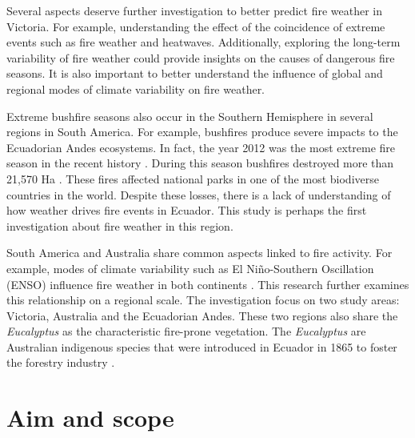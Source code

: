 Several aspects deserve further investigation to better predict fire
weather in Victoria. For example, understanding the effect of the coincidence of extreme
events such as fire weather and heatwaves. Additionally,
exploring the long-term variability of fire weather could provide
insights on the causes of dangerous fire seasons. It is also important
to better understand the influence of global and regional modes of climate
variability on fire weather.

Extreme bushfire seasons also occur in the Southern Hemisphere in several
regions in South America. For example, bushfires produce severe impacts
to the Ecuadorian Andes ecosystems. In fact, the year 2012 was the
most extreme fire season in the recent history \citep{MinisteriodelAmbiente2013,SecretariadeAmbiente2013}.
During this season bushfires destroyed more than 21,570 Ha \citep{MinisteriodelAmbiente2013}.
These fires affected national parks in one of the most biodiverse
countries in the world. Despite these losses, there is a lack of understanding
of how weather drives fire events in Ecuador. This study is perhaps the first
investigation about fire weather in this region. 

South America and Australia share common aspects linked to fire activity.
For example, modes of climate variability such as El Ni\~no-Southern
Oscillation (ENSO) influence fire weather in both continents \citep{Williams1999,Chen2011}.
This research further examines this relationship on a regional scale.
The investigation focus on two study areas: Victoria, Australia and
the Ecuadorian Andes. These two regions also share the \textit{Eucalyptus}
as the characteristic fire-prone vegetation. The \textit{Eucalyptus} are Australian indigenous species
that were introduced in Ecuador in 1865 to foster the forestry industry \citep{Anchaluisa2013}.    


\section{Aim and scope}

